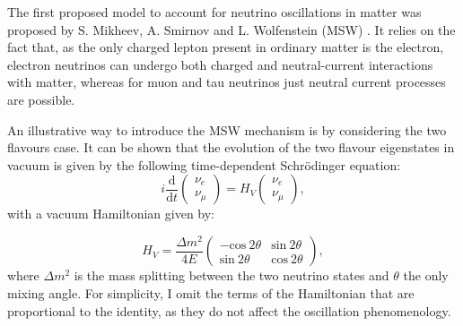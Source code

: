 The first proposed model to account for neutrino oscillations in matter was proposed by S. Mikheev, A. Smirnov and L. Wolfenstein (MSW) \cite{Wolfenstein1977,Mikheev1986}. It relies on the fact that, as the only charged lepton present in ordinary matter is the electron, electron neutrinos can undergo both charged and neutral-current interactions with matter, whereas for muon and tau neutrinos just neutral current processes are possible.

An illustrative way to introduce the MSW mechanism is by considering the two flavours case. It can be shown that the evolution of the two flavour eigenstates in vacuum is given by the following time-dependent Schrödinger equation:
\begin{equation}
	i \frac{\mathrm{d}}{\mathrm{d}t} \begin{pmatrix}\nu_{e}\\\nu_{\mu}\end{pmatrix} = H_{V} \begin{pmatrix}\nu_{e}\\\nu_{\mu}\end{pmatrix},
\end{equation}
with a vacuum Hamiltonian given by:

\begin{equation}
	H_{V} = \frac{\Delta m^{2}}{4E} \begin{pmatrix}-\mathrm{cos}~2\theta&\mathrm{sin}~2\theta\\\mathrm{sin}~2\theta&\mathrm{cos}~2\theta\end{pmatrix},
\end{equation}
where $\Delta m^{2}$ is the mass splitting between the two neutrino states and $\theta$ the only mixing angle. For simplicity, I omit the terms of the Hamiltonian that are proportional to the identity, as they do not affect the oscillation phenomenology.


